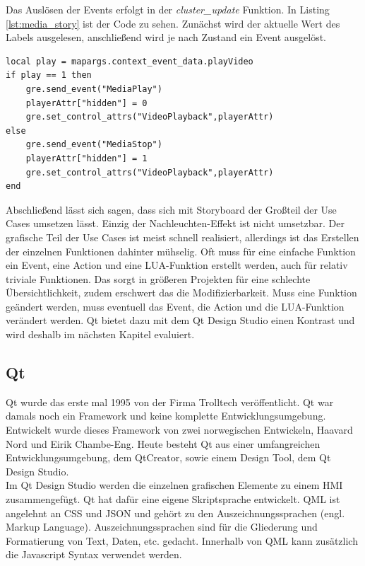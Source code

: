 Das Auslösen der Events erfolgt in der \textit{cluster\_update} Funktion. In Listing \ref{lst:media_story} ist der Code zu sehen. Zunächst wird der aktuelle Wert des Labels ausgelesen, anschließend wird je nach Zustand ein Event ausgelöst.\\

\begin{lstlisting}[frame=htrbl, caption={callbacks.lua}, label={lst:media_story}]
local play = mapargs.context_event_data.playVideo
if play == 1 then
	gre.send_event("MediaPlay")
	playerAttr["hidden"] = 0
	gre.set_control_attrs("VideoPlayback",playerAttr)
else
	gre.send_event("MediaStop")
	playerAttr["hidden"] = 1
	gre.set_control_attrs("VideoPlayback",playerAttr)
end
\end{lstlisting}

Abschließend lässt sich sagen, dass sich mit Storyboard der Großteil der Use Cases umsetzen lässt. Einzig der Nachleuchten-Effekt ist nicht umsetzbar. Der grafische Teil der Use Cases ist meist schnell realisiert, allerdings ist das Erstellen der einzelnen Funktionen dahinter mühselig. Oft muss für eine einfache Funktion ein Event, eine Action und eine LUA-Funktion erstellt werden, auch für relativ triviale Funktionen. Das sorgt in größeren Projekten für eine schlechte Übersichtlichkeit, zudem erschwert das die Modifizierbarkeit. Muss eine Funktion geändert werden, muss eventuell das Event, die Action und die LUA-Funktion verändert werden. Qt bietet dazu mit dem Qt Design Studio einen Kontrast und wird deshalb im nächsten Kapitel evaluiert.\\

\subsection{Qt}
\label{qt}
Qt wurde das erste mal 1995 von der Firma Trolltech veröffentlicht. Qt war damals noch ein Framework und keine komplette Entwicklungsumgebung. Entwickelt wurde dieses Framework von zwei norwegischen Entwickeln, Haavard Nord und Eirik Chambe-Eng. Heute besteht Qt aus einer umfangreichen Entwicklungsumgebung, dem QtCreator, sowie einem Design Tool, dem Qt Design Studio. \cite{qt_company}\\

Im Qt Design Studio werden die einzelnen grafischen Elemente zu einem \ac{HMI} zusammengefügt. Qt hat dafür eine eigene Skriptsprache entwickelt. \ac{QML} ist angelehnt an CSS und JSON und gehört zu den Auszeichnungssprachen (engl. Markup Language). Auszeichnungssprachen sind für die Gliederung und Formatierung von Text, Daten, etc. gedacht. Innerhalb von \ac{QML} kann zusätzlich die Javascript Syntax verwendet werden.\\

